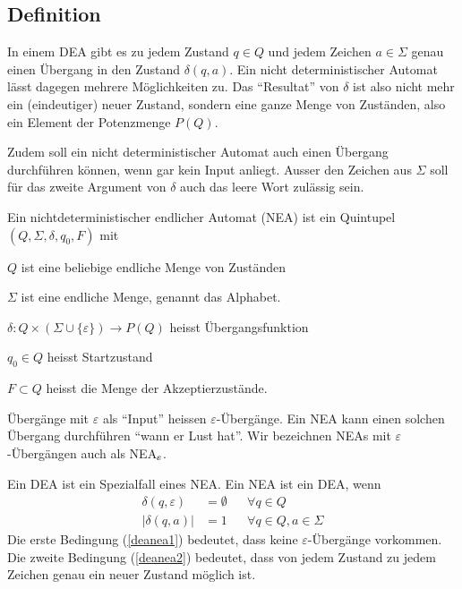 \subsection{Definition\label{regulaer:definition-nea}}
In einem DEA gibt es zu jedem Zustand $q\in Q$
und jedem Zeichen $a\in\Sigma$ genau
einen Übergang in den Zustand $\delta(q,a)$.
Ein nicht deterministischer Automat lässt dagegen mehrere Möglichkeiten zu.
Das ``Resultat''
von $\delta$ ist also nicht mehr ein (eindeutiger) neuer Zustand, sondern
eine ganze Menge von Zuständen, also ein Element der Potenzmenge $P(Q)$.

Zudem soll ein
nicht deterministischer Automat auch einen Übergang durchführen
können, wenn gar kein Input anliegt.
Ausser den Zeichen aus $\Sigma$ soll für das zweite Argument
von $\delta$ auch das leere Wort zulässig sein.

\begin{definition}\label{definition_nea}
Ein nichtdeterministischer endlicher Automat (NEA) ist ein Quintupel
$(Q,\Sigma,\delta, q_0,F)$ mit
\begin{compactenum}
\item $Q$ ist eine beliebige endliche Menge von Zuständen
\item $\Sigma$ ist eine endliche Menge, genannt das Alphabet.
\item $\delta\colon Q\times(\Sigma\cup\{\varepsilon\})\to P(Q)$ heisst Übergangsfunktion
\item $q_0\in Q$ heisst Startzustand
\item $F\subset Q$ heisst die Menge der Akzeptierzustände.
\end{compactenum}
\end{definition}
Übergänge mit $\varepsilon$ als ``Input'' heissen $\varepsilon$-Übergänge.
Ein NEA kann einen solchen Übergang durchführen ``wann er Lust hat''.
Wir bezeichnen NEAs mit $\varepsilon$-Übergängen auch als
NEA$\mathstrut_\varepsilon$.

Ein DEA ist ein Spezialfall eines NEA.
Ein NEA ist ein DEA, wenn
\begin{align}
\delta(q,\varepsilon)&=\emptyset&&\forall q\in Q\label{deanea1}\\
|\delta(q,a)|&=1&&\forall q\in Q, a\in\Sigma\label{deanea2}
\end{align}
Die erste Bedingung (\ref{deanea1}) bedeutet, dass keine
$\varepsilon$-Übergänge vorkommen.
Die zweite Bedingung (\ref{deanea2}) bedeutet, dass von jedem Zustand zu
jedem Zeichen genau ein neuer Zustand möglich ist.

